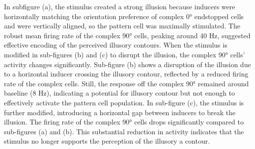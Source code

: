 \documentclass[12pt]{article}
\begin{document}
\vspace{20pt}
In subfigure (a), the stimulus created a strong illusion because inducers were horizontally matching the orientation preference of complex 0° endstopped cells and were vertically aligned, so the pattern cell was maximally stimulated. The robust mean firing rate of the complex 90° cells, peaking around 40 Hz, suggested effective encoding of the perceived illusory contours. When the stimulus is modified in sub-figures (b) and (c) to disrupt the illusion, the complex 90° cells' activity changes significantly. Sub-figure (b) shows a disruption of the illusion due to a horizontal inducer crossing the illusory contour, reflected by a reduced firing rate of the complex cells. Still, the response off the complex 90° remained around baseline (8 Hz), indicating a potential for illusory contour but not enough to effectively activate the pattern cell population. In sub-figure (c), the stimulus is further modified, introducing a horizontal gap between inducers to break the illusion. The firing rate of the complex 90° cells drops significantly compared to sub-figures (a) and (b). This substantial reduction in activity indicates that the stimulus no longer supports the perception of the illusory a contour. 
\end{document}
